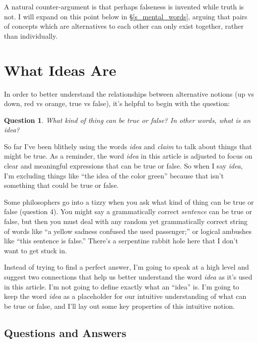 \documentclass[11pt, oneside]{article}   	%
\newtheorem{question}{Question}
\begin{document}
A natural counter-argument is that perhaps falseness is invented while truth is
not.
I will expand on this point below in \S\ref{s_mental_words},
arguing that pairs of concepts which are alternatives to
each other can only exist together,
rather than individually.

\section{What Ideas Are}

In order to better understand the relationships between alternative
notions (up vs down, red vs orange, true vs false), it's
helpful to begin with the question:
\begin{question}
    What kind of thing can be true or false?
    In other words, what is an idea?
\end{question}

So far I've been blithely using the words {\em idea} and {\em claim} to talk
about things that might be true.
As a reminder, the word {\em idea} in this article is adjusted to focus on
clear and meaningful expressions that can be true or false.
So when I say {\em idea}, I'm excluding
things like ``the idea of the color green'' because that isn't something that
could be true or false.

Some philosophers go into a tizzy when you ask
what kind of thing can be true or false (question 4).
You might say a grammatically correct {\em sentence} can be true or false,
but then you must deal with any random yet grammatically correct string
of words
like ``a yellow sadness confused the used
passenger;'' or logical ambushes like ``this sentence is false.''
There's a serpentine rabbit hole here that I don't want to get stuck in.

Instead of trying to find a perfect answer, I'm going to speak at a high level
and suggest two connections that help us better understand the word {\em idea}
as it's used in this article.
I'm not going to define exactly what an ``idea'' is.
I'm going to keep the word {\em idea} as a placeholder for our
intuitive understanding of what can be true or false, and I'll lay out some key
properties of this intuitive notion.

\subsection{Questions and Answers}
\end{document}
